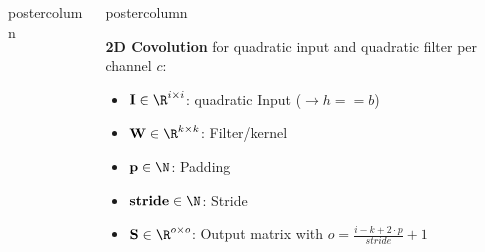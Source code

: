 \documentclass{beamer}
\newlength{\columnheight} %
\begin{document}
\begin{frame}[fragile]{}
\begin{columns}
\begin{column}{.31\textwidth}
\begin{beamercolorbox}[center]{postercolumn}
\begin{minipage}{.98\textwidth}
{%
				}
			\end{minipage}
		\end{beamercolorbox}
	\end{column}
	\begin{column}{.31\textwidth}
		\begin{beamercolorbox}[center]{postercolumn}
			\begin{minipage}{.98\textwidth}
				\parbox[t][\columnheight]{\textwidth}{
% 
% 
\begin{myblock}{}
\textbf{2D Covolution} for quadratic input and quadratic filter per channel $c$:
\begin{itemize}
\item[] $\mathbf{I} \in \R^{i \times i}$: quadratic Input ($\rightarrow h == b$)
\item[] $\mathbf{W} \in \R^{k \times k}$: Filter/kernel 
\item[] $\mathbf{p} \in \N$: Padding
\item[] $\mathbf{stride} \in \N$: Stride
\item[] $\mathbf{S} \in \R^{o \times o}$: Output matrix with 
$o = \frac{i - k + 2 \cdot p}{stride} + 1$ \\
\end{itemize}
\end{myblock}


}
\end{minipage}
\end{beamercolorbox}
\end{column}
\end{columns}
\end{frame}
\end{document}
